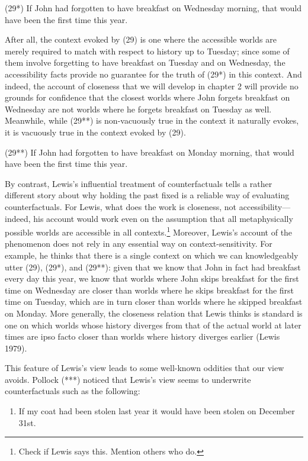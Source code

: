 (29*) If John had forgotten to have breakfast on Wednesday morning, that
would have been the first time this year.

After all, the context evoked by (29) is one where the accessible worlds
are merely required to match with respect to history up to Tuesday;
since some of them involve forgetting to have breakfast on Tuesday and
on Wednesday, the accessibility facts provide no guarantee for the truth
of (29*) in this context. And indeed, the account of closeness that we
will develop in chapter 2 will provide no grounds for confidence that
the closest worlds where John forgets breakfast on Wednesday are not
worlds where he forgets breakfast on Tuesday as well. Meanwhile, while
(29**) is non-vacuously true in the context it naturally evokes, it is
vacuously true in the context evoked by (29).

(29**) If John had forgotten to have breakfast on Monday morning, that
would have been the first time this year.

By contrast, Lewis's influential treatment of counterfactuals tells a
rather different story about why holding the past fixed is a reliable
way of evaluating counterfactuals. For Lewis, what does the work is
closeness, not accessibility---indeed, his account would work even on
the assumption that all metaphysically possible worlds are accessible in
all contexts.\footnote{Check if Lewis says this. Mention others who do.}
Moreover, Lewis's account of the phenomenon does not rely in any
essential way on context-sensitivity. For example, he thinks that there
is a single context on which we can knowledgeably utter (29), (29*), and
(29**): given that we know that John in fact had breakfast every day
this year, we know that worlds where John skips breakfast for the first
time on Wednesday are closer than worlds where he skips breakfast for
the first time on Tuesday, which are in turn closer than worlds where he
skipped breakfast on Monday. More generally, the closeness relation that
Lewis thinks is standard is one on which worlds whose history diverges
from that of the actual world at later times are ipso facto closer than
worlds where history diverges earlier (Lewis 1979).

This feature of Lewis's view leads to some well-known oddities that our
view avoids. Pollock (***) noticed that Lewis's view seems to underwrite
counterfactuals such as the following:

\begin{enumerate}
\def\labelenumi{(\arabic{enumi})}
\setcounter{enumi}{39}
\itemsep1pt\parskip0pt
\item
  If my coat had been stolen last year it would have been stolen on
  December 31st.
\end{enumerate}

